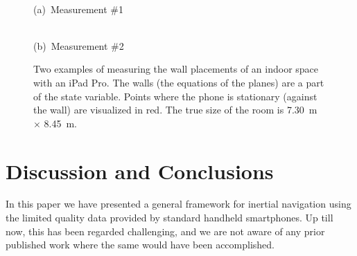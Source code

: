 \documentclass[conference]{ieeetran}
\newlength\figureheight
\newlength\figurewidth
\begin{document}
\begin{figure}[!t]


  \footnotesize\centering%
  \begin{minipage}{.49\columnwidth}


    \setlength{\figurewidth}{1.15\columnwidth}
    \setlength{\figureheight}{0.7498\figurewidth}
    \centering
    \\ \vspace*{1em}
    {\footnotesize {(a)~Measurement \#1}} \\
  \end{minipage}%
  \begin{minipage}{.49\columnwidth}


    \setlength{\figurewidth}{1.15\columnwidth}
    \setlength{\figureheight}{0.7505\figurewidth}
    \centering
    \\ \vspace*{1em}
    {\footnotesize {(b)~Measurement \#2}} \\
  \end{minipage}
  \tikzexternalenable
  \caption{Two examples of measuring the wall placements of an indoor space with an iPad Pro. The walls (the equations of the planes) are a part of the state variable. Points where the phone is stationary (against the wall) are visualized in red. The true size of the room is 7.30~m $\times$ 8.45~m.}
  \label{fig:roomscan}
  \vspace*{-1em}
\end{figure}




\section{Discussion and Conclusions}
\label{sec:discussion}
\noindent
In this paper we have presented a general framework for inertial navigation using the limited quality data provided by standard handheld smartphones. Up till now, this has been regarded challenging, and we are not aware of any prior published work where the same would have been accomplished.
\end{document}
